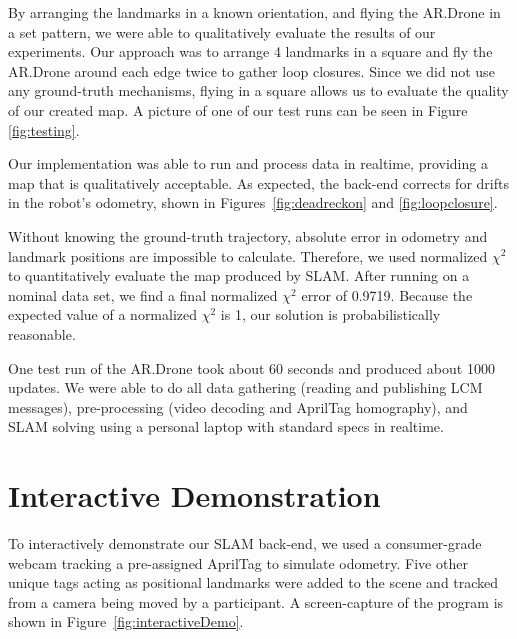 \documentclass[conference]{IEEEtran}
\begin{document}
By arranging the landmarks in a known orientation, and flying the AR.Drone in a set
pattern, we were able to qualitatively evaluate the results of our experiments. Our
approach was to arrange 4 landmarks in a square and fly the AR.Drone around each edge
twice to gather loop closures. Since we did not use any ground-truth mechanisms, flying in
a square allows us to evaluate the quality of our created map. A picture of one of our
test runs can be seen in Figure \ref{fig:testing}.

Our implementation was able to run and process data in realtime, providing a map that is
qualitatively acceptable.  As expected, the back-end corrects for drifts in the robot's
odometry, shown in Figures~\ref{fig:deadreckon} and \ref{fig:loopclosure}.


Without knowing the ground-truth trajectory, absolute error in odometry and landmark
positions are impossible to calculate.  Therefore, we used normalized $\chi^2$ to
quantitatively evaluate the map produced by \ac{SLAM}.  After running on a nominal data
set, we find a final normalized $\chi^2$ error of 0.9719.  Because the expected
value of a normalized $\chi^2$ is 1, our solution is probabilistically reasonable.

One test run of the AR.Drone took about 60 seconds and produced about 1000 updates. We
were able to do all data gathering (reading and publishing LCM messages), pre-processing
(video decoding and AprilTag homography), and \ac{SLAM} solving using a personal laptop
with standard specs in realtime.

\section{Interactive Demonstration}

To interactively demonstrate our \ac{SLAM} back-end, we used a consumer-grade webcam
tracking a pre-assigned AprilTag to simulate odometry. Five other unique tags acting as
positional landmarks were added to the scene and tracked from a camera being moved by a
participant. A screen-capture of the program is shown in Figure~\ref{fig:interactiveDemo}.
\end{document}
